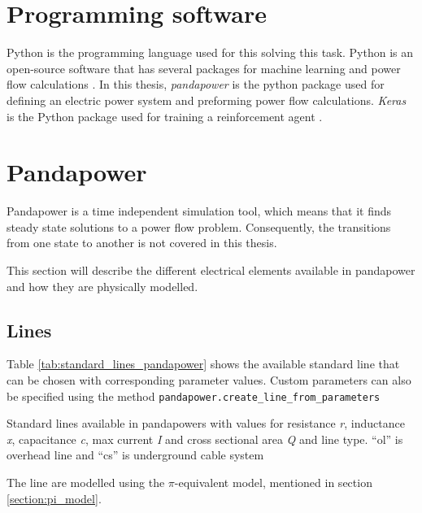\documentclass[class=book, crop=false]{standalone}
\begin{document}
\section{Programming software}
Python is the programming language used for this solving this task. Python is an open-source software that has several packages for machine learning and power flow calculations \cite{python_web}. In this thesis, \textit{pandapower} is the python package used for defining an electric power system and preforming power flow calculations\cite{pandapower}. \textit{Keras} is the Python package used for training a reinforcement agent \cite{keras_chollet2015}.

\section{Pandapower}
Pandapower is a time independent simulation tool, which means that it finds steady state solutions to a power flow problem. Consequently, the transitions from one state to another is not covered in this thesis.

This section will describe the different electrical elements available in pandapower and how they are physically modelled.
\subsection{Lines}
Table \ref{tab:standard_lines_pandapower} shows the available standard line that can be chosen with corresponding parameter values. Custom parameters can also be specified using the method \texttt{pandapower.create\_line\_from\_parameters}
\begin{table}[]
    \centering
    \caption{Standard lines available in pandapowers with values for resistance \textit{r}, inductance \textit{x}, capacitance \textit{c}, max current \textit{I} and cross sectional area \textit{Q} and line type. “ol” is overhead line and “cs” is underground cable system}
    \label{tab:standard_lines_pandapower}
\end{table}
The line are modelled using the $\pi$-equivalent model, mentioned in section \ref{section:pi_model}.
\end{document}
